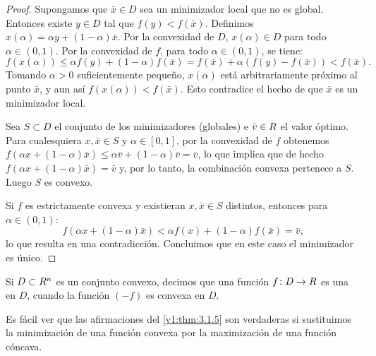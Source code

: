 \begin{proof}
 Supongamos que $\bar{x} \in D$ sea un minimizador local que no es global. Entonces existe $y \in D$ tal que $f(y) < f(\bar{x})$. Definimos $x(\alpha) = \alpha y + (1 - \alpha)\bar{x}$. Por la convexidad de $D$, $x(\alpha) \in D$ para todo $\alpha \in (0, 1)$. Por la convexidad de $f$, para todo $\alpha \in (0, 1)$, se tiene:
 \[
 f(x(\alpha)) \leq \alpha f(y) + (1 - \alpha)f(\bar{x}) = f(\bar{x}) + \alpha(f(y) - f(\bar{x})) < f(\bar{x}).
 \]
 Tomando $\alpha > 0$ suficientemente pequeño, $x(\alpha)$ está arbitrariamente próximo al punto $\bar{x}$, y aun así $f(x(\alpha)) < f(\bar{x})$. Esto contradice el hecho de que $\bar{x}$ es un minimizador local.
 
 Sea $S \subset D$ el conjunto de los minimizadores (globales) e $\bar{v} \in R$ el valor óptimo. Para cualesquiera $x, \bar{x} \in S$ y $\alpha \in [0, 1]$, por la convexidad de $f$ obtenemos $f(\alpha x + (1 - \alpha)\bar{x}) \leq \alpha \bar{v} + (1 - \alpha)\bar{v} = \bar{v}$, lo que implica que de hecho $f(\alpha x + (1 - \alpha)\bar{x}) = \bar{v}$ y, por lo tanto, la combinación convexa pertenece a $S$. Luego $S$ es convexo.
 
 Si $f$ es estrictamente convexa y existieran $x, \bar{x} \in S$ distintos, entonces para $\alpha \in (0, 1)$:
 \[
 f(\alpha x + (1 - \alpha)\bar{x}) < \alpha f(x) + (1 - \alpha)f(\bar{x}) = \bar{v},
 \]
 lo que resulta en una contradicción. Concluimos que en este caso el minimizador es único.
\end{proof}

\begin{definition}\label{v1:def:3.1.6}
 Si $D \subset R^n$ es un conjunto convexo, decimos que una función $f \colon D \to R$ es una  en $D$, cuando la función $(-f)$ es convexa en $D$.
\end{definition}

Es fácil ver que las afirmaciones del \cref{v1:thm:3.1.5} son verdaderas si sustituimos la minimización de una función convexa por la maximización de una función cóncava.

